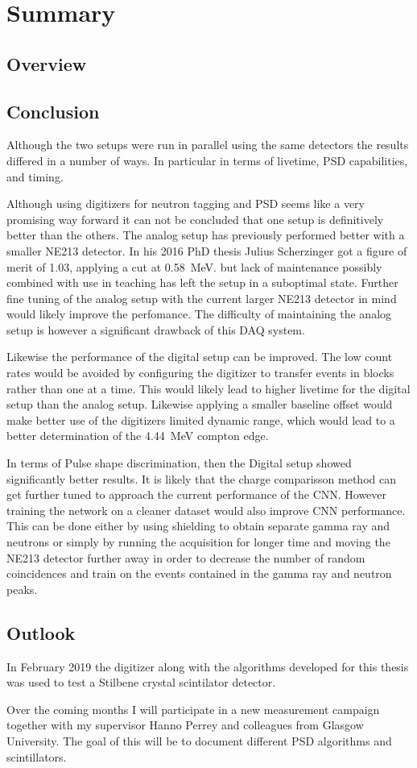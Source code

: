 \documentclass[main.tex]{subfiles}
\begin{document}
\chapter{Summary}

\section{Overview}
\section{Conclusion}
Although the two setups were run in parallel using the same detectors the results differed in a number of ways. In particular in terms of livetime, PSD capabilities, and timing.

Although using digitizers for neutron tagging and PSD seems like a very promising way forward it can not be concluded that one setup is definitively better than the others. The analog setup has previously performed better with a smaller NE213 detector. In his 2016 PhD thesis Julius Scherzinger got a figure of merit of 1.03, applying a cut at \SI{0.58}{\MeV}\cite{ScherzingerPhd}. but lack of maintenance possibly combined with use in teaching has left the setup in a suboptimal state. Further fine tuning of the analog setup with the current larger NE213 detector in mind would likely improve the perfomance. The difficulty of maintaining the analog setup is however a significant drawback of this DAQ system.

Likewise the performance of the digital setup can be improved. The low count rates would be avoided by configuring the digitizer to transfer events in blocks rather than one at a time. This would likely lead to higher livetime for the digital setup than the analog setup.
Likewise applying a smaller baseline offset would make better use of the digitizers limited dynamic range, which would lead to a better determination of the \SI{4.44}{\MeV} compton edge.

In terms of Pulse shape discrimination, then the Digital setup showed significantly better results. It is likely that the charge comparisson method can get further tuned to approach the current performance of the CNN. However training the network on a cleaner dataset would also improve CNN performance. This can be done either by using shielding to obtain separate gamma ray and neutrons or simply by running the acquisition for longer time and moving the NE213 detector further away in order to decrease the number of random coincidences and train on the events contained in the gamma ray and neutron peaks. 

\section{Outlook}
In February 2019 the digitizer along with the algorithms developed for this thesis was used to test a Stilbene crystal scintilator detector.


Over the coming months I will participate in a new measurement campaign together with my supervisor Hanno Perrey and colleagues from Glasgow University. The goal of this will be to document different PSD algorithms and scintillators.
\end{document}
